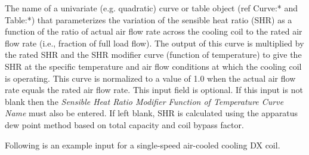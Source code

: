 The name of a univariate (e.g. quadratic) curve or table object (ref Curve:* and Table:*) that parameterizes the variation of the sensible heat ratio (SHR) as a function of the ratio of actual air flow rate across the cooling coil to the rated air flow rate (i.e., fraction of full load flow). The output of this curve is multiplied by the rated SHR and the SHR modifier curve (function of temperature) to give the SHR at the specific temperature and air flow conditions at which the cooling coil is operating. This curve is normalized to a value of 1.0 when the actual air flow rate equals the rated air flow rate. This input field is optional. If this input is not blank then the \textit{Sensible Heat Ratio Modifier Function of Temperature Curve Name} must also be entered. If left blank, SHR is calculated using the apparatus dew point method based on total capacity and coil bypass factor.

Following is an example input for a single-speed air-cooled cooling DX coil.

